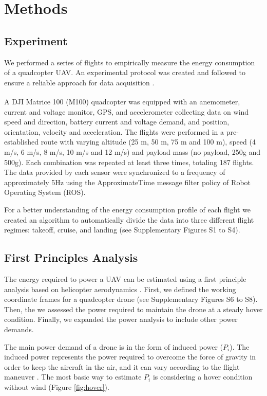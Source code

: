 \documentclass{article}
\begin{document}
\section{Methods}

\subsection{Experiment}
We performed a series of flights to empirically measure the energy consumption of a quadcopter UAV. An experimental protocol was created and followed to ensure a reliable approach for data acquisition \cite{Rodrigues2021In-flightDelivery}. 

A DJI\textsuperscript{\textregistered}  Matrice 100 (M100) quadcopter was equipped with an anemometer, current and voltage monitor, GPS, and accelerometer collecting data on wind speed and direction, battery current and voltage demand, and position, orientation, velocity and acceleration. The flights were performed in a pre-established route with varying altitude (25 m, 50 m, 75 m and 100 m), speed (4 m/s, 6 m/s, 8 m/s, 10 m/s and 12 m/s) and payload mass (no payload, 250g and 500g). Each combination was repeated at least three times, totaling 187 flights. The data provided by each sensor were synchronized to a frequency of approximately 5Hz using the ApproximateTime \cite{Foundation2010} message filter policy of Robot Operating System (ROS).

For a better understanding of the energy consumption profile of each flight we created an algorithm to automatically divide the data into three different flight regimes: takeoff, cruise, and landing (see Supplementary Figures S1 to S4).

\subsection{First Principles Analysis}
The energy required to power a UAV can be estimated using a first principle analysis based on helicopter aerodynamics \cite{Rotaru2017a}. First, we defined the working coordinate frames for a quadcopter drone (see Supplementary Figures S6 to S8). Then, the we assessed the power required to maintain the drone at a steady hover condition. Finally, we expanded the power analysis to include other power demands.

The main power demand of a drone is in the form of induced power ($P_{i}$). The induced power represents the power required to overcome the force of gravity in order to keep the aircraft in the air, and it can vary according to the flight maneuver \cite{Rotaru2017a}. The most basic way to estimate $P_{i}$ is considering a hover condition without wind (Figure \ref{fig:hover}). 
\end{document}
